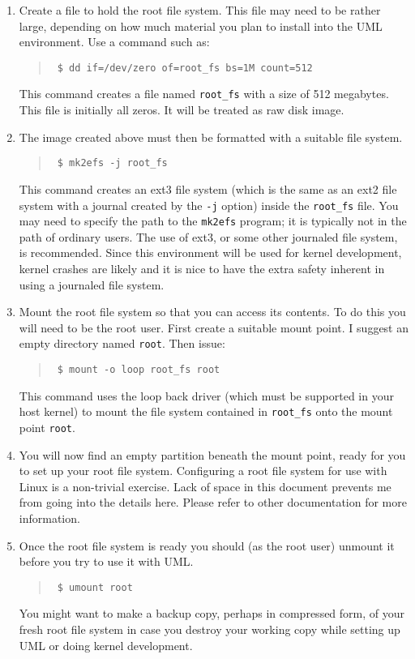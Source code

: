 \documentclass{article}
\newcommand{\command}[1]{\texttt{#1}}
\newcommand{\filename}[1]{\texttt{#1}}
\newenvironment{commands}
  {\begin{quote} \tt}
  {\end{quote}}
\begin{document}
\begin{enumerate}

\item Create a file to hold the root file system. This file may need to be rather large,
  depending on how much material you plan to install into the UML environment. Use a command
  such as:
  \begin{commands}
    \$ dd if=/dev/zero of=root\_fs bs=1M count=512
  \end{commands}

  This command creates a file named \filename{root\_fs} with a size of 512 megabytes. This file
  is initially all zeros. It will be treated as raw disk image.

\item The image created above must then be formatted with a suitable file system.
  \begin{commands}
    \$ mk2efs -j root\_fs
  \end{commands}

  This command creates an ext3 file system (which is the same as an ext2 file system with a
  journal created by the \command{-j} option) inside the \filename{root\_fs} file. You may need
  to specify the path to the \command{mk2efs} program; it is typically not in the path of
  ordinary users. The use of ext3, or some other journaled file system, is recommended. Since
  this environment will be used for kernel development, kernel crashes are likely and it is nice
  to have the extra safety inherent in using a journaled file system.

\item Mount the root file system so that you can access its contents. To do this you will need
  to be the root user. First create a suitable mount point. I suggest an empty directory named
  \filename{root}. Then issue:
  \begin{commands}
    \$ mount -o loop root\_fs root
  \end{commands}

  This command uses the loop back driver (which must be supported in your host kernel) to mount
  the file system contained in \filename{root\_fs} onto the mount point \filename{root}.

\item You will now find an empty partition beneath the mount point, ready for you to set up your
  root file system. Configuring a root file system for use with Linux is a non-trivial exercise.
  Lack of space in this document prevents me from going into the details here. Please refer to
  other documentation for more information.

\item Once the root file system is ready you should (as the root user) unmount it before you try
  to use it with UML.
  \begin{commands}
    \$ umount root
  \end{commands}

  You might want to make a backup copy, perhaps in compressed form, of your fresh root file
  system in case you destroy your working copy while setting up UML or doing kernel development.

\end{enumerate}
\end{document}
